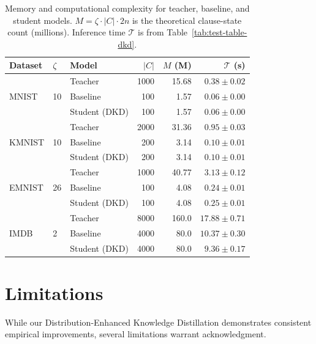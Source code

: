 \documentclass[sn-mathphys-num]{sn-jnl}%
\theoremstyle{thmstyleone}%
\theoremstyle{thmstyletwo}%
\theoremstyle{thmstylethree}%
\begin{document}
\begin{table}[h]
	\caption{Memory and computational complexity for teacher, baseline, and student 
		models. $M = \zeta \cdot |C| \cdot 2n$ is the theoretical clause-state count 
		(millions). Inference time $\mathcal{T}$ is from Table~\ref{tab:test-table-dkd}.}
	\label{tab:complexity}
	\centering
    \begin{tabular}{lllrrr}
        \hline
        Dataset & $\zeta$ & Model & $|C|$ & $M$ (M) & $\mathcal{T}$ (s) \\
        \hline
        \multirow{3}{*}{MNIST}   & \multirow{3}{*}{10} & Teacher       & 1000 & 15.68 & $0.38 \pm 0.02$ \\
                                 &                     & Baseline      & 100  & 1.57  & $0.06 \pm 0.00$ \\
                                 &                     & Student (DKD) & 100  & 1.57  & $0.06 \pm 0.00$ \\
        \hline
        \multirow{3}{*}{KMNIST}  & \multirow{3}{*}{10} & Teacher       & 2000 & 31.36 & $0.95 \pm 0.03$ \\
                                 &                     & Baseline      & 200  & 3.14  & $0.10 \pm 0.01$ \\
                                 &                     & Student (DKD) & 200  & 3.14  & $0.10 \pm 0.01$ \\
        \hline
        \multirow{3}{*}{EMNIST}  & \multirow{3}{*}{26} & Teacher       & 1000 & 40.77 & $3.13 \pm 0.12$ \\
                                 &                     & Baseline      & 100  & 4.08  & $0.24 \pm 0.01$ \\
                                 &                     & Student (DKD) & 100  & 4.08  & $0.25 \pm 0.01$ \\
        \hline
        \multirow{3}{*}{IMDB}    & \multirow{3}{*}{2}  & Teacher       & 8000 & 160.0 & $17.88 \pm 0.71$ \\
                                 &                     & Baseline      & 4000 & 80.0  & $10.37 \pm 0.30$ \\
                                 &                     & Student (DKD) & 4000 & 80.0  & $9.36  \pm 0.17$ \\
        \hline
    \end{tabular}
\end{table}

\section{Limitations}
While our Distribution-Enhanced Knowledge Distillation demonstrates consistent empirical improvements, several limitations warrant acknowledgment.
\end{document}
